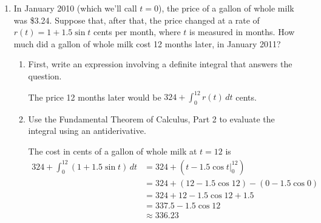 \documentclass[main]{subfiles}
\begin{document}
\begin{enumerate}
\item 

  \begin{problem}[\vfill]
    In January 2010 (which we'll call $t = 0$), the price of a gallon of
    whole milk was \$3.24.  Suppose that, after that, the price changed at
    a rate of $r(t) = 1 + 1.5 \sin t$ cents per month, where $t$ is measured
    in months.  How much did a gallon of whole milk cost 12 months later,
    in January 2011?

    \begin{enumerate}
    \item First, write an expression involving a definite integral that
    answers the question. 
    
    \begin{solution}
        The price 12 months later would be $\boxed{324+
        \displaystyle\int_0^{12} r(t)\,dt}$ cents.
    \end{solution}
    \pspace{\vfill}
    
    \item Use the Fundamental Theorem of Calculus, Part 2 to evaluate
    the integral using an antiderivative.
    
      \begin{solution}
    The cost in cents of a gallon of whole milk at $t = 12$ is 
    \begin{align*}
      324 + \int_0^{12} (1 + 1.5 \sin t)\,dt &= 324 + \left( t - 1.5 \cos t
        \Big|_0^{12} \right) \\
      &= 324 + (12 - 1.5 \cos 12) - (0 - 1.5 \cos 0) \\
      &= 324 + 12 - 1.5 \cos 12 + 1.5 \\
      &= \boxed{337.5 - 1.5 \cos 12} \\
      & \approx 336.23
    \end{align*}
  \end{solution}
    \end{enumerate}
  \end{problem}


\end{enumerate}
\end{document}
